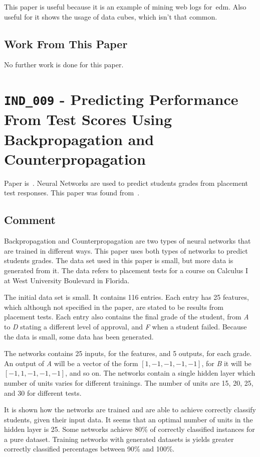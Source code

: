 This paper is useful because it is an example of mining web logs for~\gls{edm}.
Also useful for it shows the usage of data cubes, which isn't that common.

\subsection{Work From This Paper}

No further work is done for this paper.

\section{\texttt{IND\_009} - Predicting Performance From Test Scores Using
Backpropagation and Counterpropagation}

Paper is~\cite{ind_009}. Neural Networks are used to predict students grades
from placement test responses. This paper was found from~\cite{ind_007}.

\subsection{Comment}

Backpropagation and Counterpropagation are two types of neural networks that
are trained in different ways. This paper uses both types of networks to
predict students grades. The data set used in this paper is small, but more
data is generated from it. The data refers to placement tests for a course on
Calculus I at West University Boulevard in Florida.

The initial data set is small. It contains 116 entries. Each entry has 25
features, which although not specified in the paper, are stated to be results
from placement tests. Each entry also contains the final grade of the student,
from \textit{A} to \textit{D} stating a different level of approval, and
\textit{F} when a student failed. Because the data is small, some data has been
generated.

The networks contains 25 inputs, for the features, and 5 outputs, for each
grade. An output of \textit{A} will be a vector of the form $ [1, -1, -1, -1,
-1] $, for \textit{B} it will be $ [-1, 1, -1, -1, -1] $, and so on. The
networks contain a single hidden layer which number of units varies for
different trainings. The number of units are 15, 20, 25, and 30 for different
tests.

It is shown how the networks are trained and are able to achieve correctly
classify students, given their input data. It seems that an optimal number of
units in the hidden layer is 25. Some networks achieve 80\% of correctly
classified instances for a pure dataset. Training networks with generated
datasets is yields greater correctly classified percentages between 90\% and
100\%.

